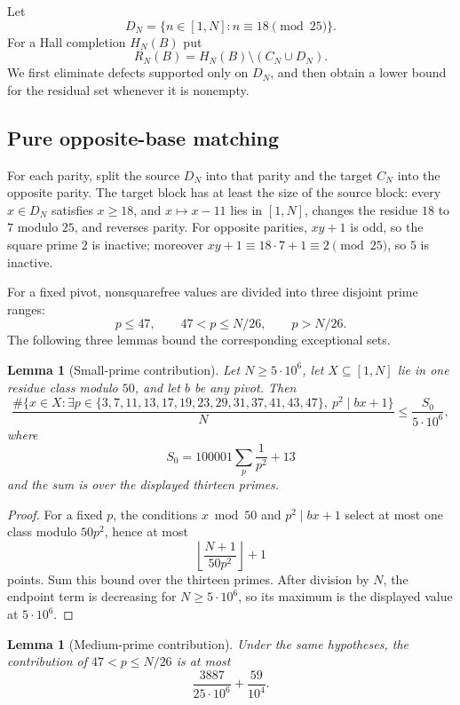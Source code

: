 \documentclass[11pt]{article}
\newtheorem{lemma}[theorem]{Lemma}
\theoremstyle{definition}
\newcommand{\CN}{C_N}
\newcommand{\DN}{D_N}
\newcommand{\RN}{R_N}
\newcommand{\FiveMillion}{5\cdot10^6}
\begin{document}
Let
\[
  \DN=\{n\in[1,N]:n\equiv18\pmod {25}\}.
\]
For a Hall completion $H_N(B)$ put
\[
  \RN(B)=H_N(B)\setminus(\CN\cup\DN).
\]
 We first eliminate defects supported only on $\DN$, and then obtain a lower
 bound for the residual set whenever it is nonempty.

\subsection{Pure opposite-base matching}

For each parity, split the source $\DN$ into that parity and the target
$\CN$ into the opposite parity.  The target block has at least the size of
the source block: every $x\in\DN$ satisfies $x\geq18$, and
$x\mapsto x-11$ lies in $[1,N]$, changes the residue $18$ to $7$ modulo $25$,
and reverses parity.  For opposite parities, $xy+1$ is odd, so the
square prime $2$ is inactive; moreover
$xy+1\equiv18\cdot7+1\equiv2\pmod {25}$, so $5$ is inactive.

For a fixed pivot, nonsquarefree values are divided into three disjoint
prime ranges:
\[
 p\leq47,\qquad 47<p\leq N/26,\qquad p>N/26.
\]
 The following three lemmas bound the corresponding exceptional sets.

\begin{lemma}[Small-prime contribution]\label{lem:pure-global-small}
Let $N\geq\FiveMillion$, let $X\subseteq[1,N]$ lie in one residue class
modulo $50$, and let $b$ be any pivot.  Then
\[
 \frac{\#\{x\in X:\exists p\in
 \{3,7,11,13,17,19,23,29,31,37,41,43,47\},\
 p^2\mid bx+1\}}{N}
 \leq \frac{S_0}{\FiveMillion},
\]
where
\[
 S_0=100001\sum_{p}\frac1{p^2}+13
\]
and the sum is over the displayed thirteen primes.
\end{lemma}

\begin{proof}
For a fixed $p$, the conditions $x\bmod50$ and $p^2\mid bx+1$ select at
most one class modulo $50p^2$, hence at most
\[
 \left\lfloor\frac{N+1}{50p^2}\right\rfloor+1
\]
points.  Sum this bound over the thirteen primes.  After division by $N$,
the endpoint term is decreasing for $N\geq\FiveMillion$, so its maximum is
the displayed value at $\FiveMillion$.
\end{proof}

\begin{lemma}[Medium-prime contribution]\label{lem:pure-global-medium}
Under the same hypotheses, the contribution of
$47<p\leq N/26$ is at most
\[
 \frac{3887}{25\cdot10^6}+\frac{59}{10^4}.
\]
\end{lemma}
\end{document}
